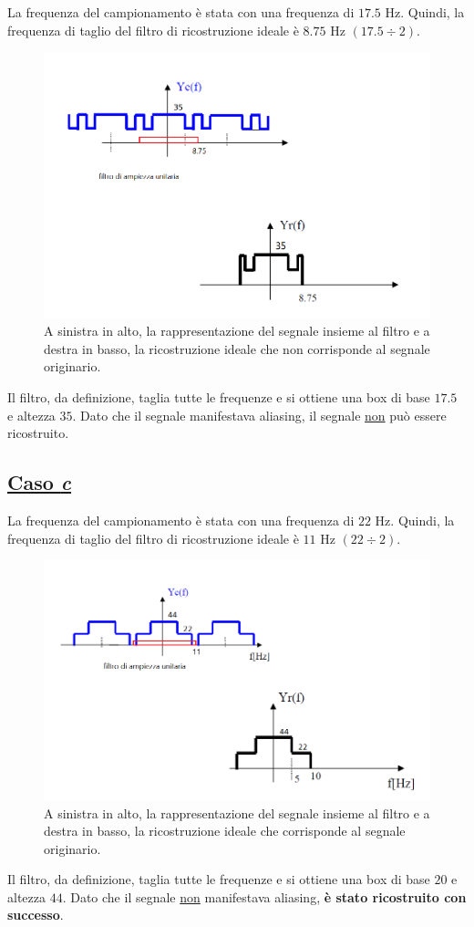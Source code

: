 \documentclass[a4paper]{article}
\begin{document}
	La frequenza del campionamento è stata con una frequenza di $17.5$ Hz. Quindi, la frequenza di taglio del filtro di ricostruzione ideale è $8.75$ Hz $\left(17.5 \div 2\right)$.
	\begin{figure}[!htp]
		\centering
		\includegraphics[width=\textwidth]{img/fig_10.png}
		\caption*{A sinistra in alto, la rappresentazione del segnale insieme al filtro e a destra in basso, la ricostruzione ideale che non corrisponde al segnale originario.}
	\end{figure}
	
	\noindent
	Il filtro, da definizione, taglia tutte le frequenze e si ottiene una box di base $17.5$ e altezza $35$. Dato che il segnale manifestava aliasing, il segnale \underline{non} può essere ricostruito.\newpage
	
	\subsection*{\textcolor{Green4}{\underline{Caso \emph{c}}}}
	
	La frequenza del campionamento è stata con una frequenza di $22$ Hz. Quindi, la frequenza di taglio del filtro di ricostruzione ideale è $11$ Hz $\left(22 \div 2\right)$.
	\begin{figure}[!htp]
		\centering
		\includegraphics[width=\textwidth]{img/fig_11.png}
		\caption*{A sinistra in alto, la rappresentazione del segnale insieme al filtro e a destra in basso, la ricostruzione ideale che corrisponde al segnale originario.}
	\end{figure}
	
	\noindent
	Il filtro, da definizione, taglia tutte le frequenze e si ottiene una box di base $20$ e altezza $44$. Dato che il segnale \underline{non} manifestava aliasing, \textbf{è stato ricostruito con successo}.
\end{document}
